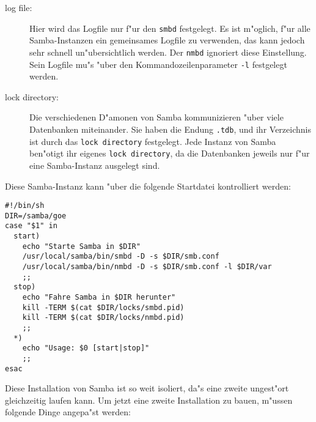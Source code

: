 \documentclass{scrartcl}\usepackage{pslatex}\typearea{12}
\newcommand{\prog}{\texttt}
\newcommand{\param}{\texttt}
\newcommand{\dateistyle}{\texttt}
\begin{document}
\begin{description}
\item[log file:] Hier wird das Logfile nur f"ur den \prog{smbd}
  festgelegt. Es ist m"oglich, f"ur alle Samba-Instanzen ein
  gemeinsames Logfile zu verwenden, das kann jedoch sehr schnell
  un"ubersichtlich werden. Der \prog{nmbd} ignoriert diese
  Einstellung. Sein Logfile mu"s "uber den Kommandozeilenparameter
  \prog{-l} festgelegt werden.
\item[lock directory:] Die verschiedenen D"amonen von Samba
  kommunizieren "uber viele Datenbanken miteinander. Sie haben die
  Endung \dateistyle{.tdb}, und ihr Verzeichnis ist durch das
  \param{lock directory} festgelegt. Jede Instanz von Samba ben"otigt
  ihr eigenes \param{lock directory}, da die Datenbanken jeweils nur
  f"ur eine Samba-Instanz ausgelegt sind.
\end{description}

Diese Samba-Instanz kann "uber die folgende Startdatei kontrolliert werden:

\begin{verbatim}
#!/bin/sh
DIR=/samba/goe
case "$1" in
  start)
    echo "Starte Samba in $DIR"
    /usr/local/samba/bin/smbd -D -s $DIR/smb.conf
    /usr/local/samba/bin/nmbd -D -s $DIR/smb.conf -l $DIR/var
    ;;
  stop)
    echo "Fahre Samba in $DIR herunter"
    kill -TERM $(cat $DIR/locks/smbd.pid)
    kill -TERM $(cat $DIR/locks/nmbd.pid)
    ;;
  *)
    echo "Usage: $0 [start|stop]"
    ;;
esac
\end{verbatim}

Diese Installation von Samba ist so weit isoliert, da"s eine zweite
ungest"ort gleichzeitig laufen kann. Um jetzt eine zweite Installation
zu bauen, m"ussen folgende Dinge angepa"st werden:
\end{document}

